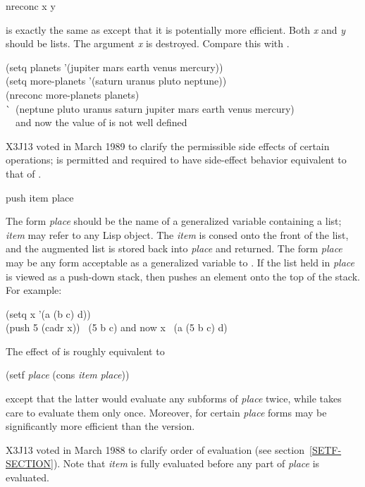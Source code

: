 
\begin{defun}[Function]
nreconc x y

 is exactly the same as 
 except that it is potentially more
efficient.  Both {\it x} and {\it y} should be lists.
The argument {\it x} is destroyed.
Compare this with .

\begin{newer}
\begin{lisp}
(setq planets '(jupiter mars earth venus mercury)) \\
(setq more-planets '(saturn uranus pluto neptune)) \\
(nreconc more-planets planets) \\
\`\EV\ (neptune pluto uranus saturn jupiter mars earth venus mercury) \\
~~{\rm and now the value of  is not well defined}
\end{lisp}
\end{newer}

\begin{newer}
X3J13 voted in March 1989 
to clarify the permissible side effects of certain operations;
 is permitted and
required to have side-effect behavior
equivalent to that of .
\end{newer}

\end{defun}


\begin{defmac}
push item place

The form {\it place} should be the name of a generalized variable
containing a list; {\it item} may refer to any Lisp object.  The {\it item}
is consed onto the front of the list, and the augmented list is stored
back into {\it place} and returned.
The form {\it place} may be any form acceptable as a
generalized variable to .  If the list held in {\it place} is
viewed as a push-down stack, then  pushes an element onto the top
of the stack.
For example:
\begin{lisp}
(setq x '(a (b c) d)) \\
(push 5 (cadr x)) \EV\ (5 b c)  {\rm and now} x \EV\ (a (5 b c) d)
\end{lisp}
The effect of 
is roughly equivalent to
\begin{lisp}
(setf {\it place} (cons {\it item} {\it place}))
\end{lisp}
except that the latter would evaluate any subforms of {\it place}
twice, while  takes care to evaluate them only once.
Moreover, for certain {\it place} forms  may be
significantly more efficient than the  version.
\begin{newer}
X3J13 voted in March 1988 
to clarify order of evaluation (see section~\ref{SETF-SECTION}).
Note that {\it item} is fully evaluated before any part of {\it place}
is evaluated.
\end{newer}
\end{defmac}

